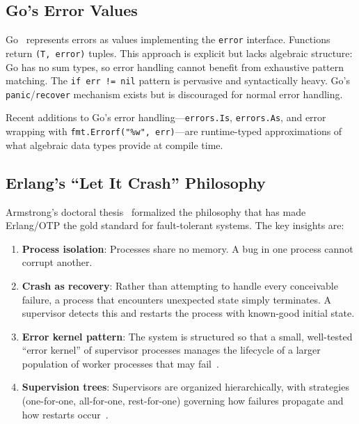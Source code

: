 \documentclass[11pt,twocolumn]{article}
\begin{document}
\subsection{Go's Error Values}

Go~\cite{pike2012go,donovan2015go} represents errors as values implementing the \texttt{error} interface. Functions return \texttt{(T, error)} tuples. This approach is explicit but lacks algebraic structure: Go has no sum types, so error handling cannot benefit from exhaustive pattern matching. The \texttt{if err != nil} pattern is pervasive and syntactically heavy. Go's \texttt{panic}/\texttt{recover} mechanism exists but is discouraged for normal error handling.

Recent additions to Go's error handling---\texttt{errors.Is}, \texttt{errors.As}, and error wrapping with \texttt{fmt.Errorf("\%w", err)}---are runtime-typed approximations of what algebraic data types provide at compile time.

\subsection{Erlang's ``Let It Crash'' Philosophy}

Armstrong's doctoral thesis~\cite{armstrong2003thesis} formalized the philosophy that has made Erlang/OTP the gold standard for fault-tolerant systems. The key insights are:

\begin{enumerate}[leftmargin=*]
  \item \textbf{Process isolation}: Processes share no memory. A bug in one process cannot corrupt another.
  \item \textbf{Crash as recovery}: Rather than attempting to handle every conceivable failure, a process that encounters unexpected state simply terminates. A supervisor detects this and restarts the process with known-good initial state.
  \item \textbf{Error kernel pattern}: The system is structured so that a small, well-tested ``error kernel'' of supervisor processes manages the lifecycle of a larger population of worker processes that may fail~\cite{armstrong2007history}.
  \item \textbf{Supervision trees}: Supervisors are organized hierarchically, with strategies (one-for-one, all-for-one, rest-for-one) governing how failures propagate and how restarts occur~\cite{logan2010erlang}.
\end{enumerate}
\end{document}
